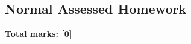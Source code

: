 \documentclass[../s1]{subfiles}
\begin{document}
\subsection*{Normal Assessed Homework}
\thispagestyle{fancy}



\begin{flushright}
\textbf{Total marks: [0]}
\end{flushright}
\end{document}
